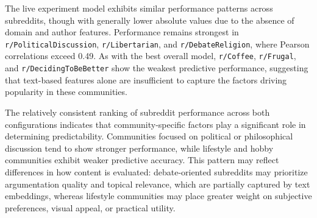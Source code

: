 The live experiment model exhibits similar performance patterns across subreddits, though with generally lower absolute values due to the absence of domain and author features. Performance remains strongest in \verb!r/PoliticalDiscussion!, \verb!r/Libertarian!, and \verb!r/DebateReligion!, where Pearson correlations exceed 0.49. As with the best overall model, \verb!r/Coffee!, \verb!r/Frugal!, and \verb!r/DecidingToBeBetter! show the weakest predictive performance, suggesting that text-based features alone are insufficient to capture the factors driving popularity in these communities.

The relatively consistent ranking of subreddit performance across both configurations indicates that community-specific factors play a significant role in determining predictability. Communities focused on political or philosophical discussion tend to show stronger performance, while lifestyle and hobby communities exhibit weaker predictive accuracy. This pattern may reflect differences in how content is evaluated: debate-oriented subreddits may prioritize argumentation quality and topical relevance, which are partially captured by text embeddings, whereas lifestyle communities may place greater weight on subjective preferences, visual appeal, or practical utility.